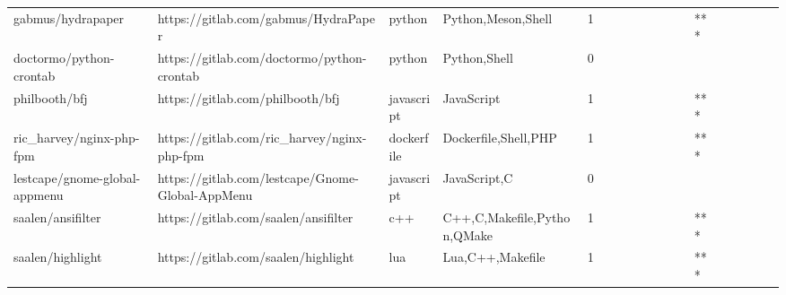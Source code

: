 \begin{tabular}{llllrlllllllllllll}
gabmus/hydrapaper                                  &               https://gitlab.com/gabmus/HydraPaper &            python &                                 Python,Meson,Shell &       1 &         &        &           &                &                 &        &           &       *** &          &          &       &              &          \\
doctormo/python-crontab                            &         https://gitlab.com/doctormo/python-crontab &            python &                                       Python,Shell &       0 &         &        &           &                &                 &        &           &           &          &          &       &              &          \\
philbooth/bfj                                      &                   https://gitlab.com/philbooth/bfj &        javascript &                                         JavaScript &       1 &         &        &           &                &                 &        &           &       *** &          &          &       &              &          \\
ric\_harvey/nginx-php-fpm                           &        https://gitlab.com/ric\_harvey/nginx-php-fpm &        dockerfile &                               Dockerfile,Shell,PHP &       1 &         &        &           &                &                 &        &           &       *** &          &          &       &              &          \\
lestcape/gnome-global-appmenu                      &   https://gitlab.com/lestcape/Gnome-Global-AppMenu &        javascript &                                       JavaScript,C &       0 &         &        &           &                &                 &        &           &           &          &          &       &              &          \\
saalen/ansifilter                                  &               https://gitlab.com/saalen/ansifilter &               c++ &                        C++,C,Makefile,Python,QMake &       1 &         &        &           &                &                 &        &           &       *** &          &          &       &              &          \\
saalen/highlight                                   &                https://gitlab.com/saalen/highlight &               lua &                                   Lua,C++,Makefile &       1 &         &        &           &                &                 &        &           &       *** &          &          &       &              &          \\

\end{tabular}
